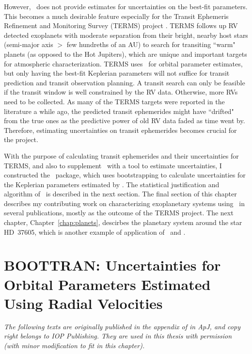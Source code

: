 However, \rvlin\ does not provide estimates for uncertainties on
the best-fit parameters. This becomes a much desirable feature
especially for the Transit Ephemeris Refinement and Monitoring Survey
(TERMS) project \citep{Kane2009}. TERMS follows up RV detected
exoplanets with moderate separation from their bright, nearby host
stars (semi-major axis $>$ few hundreths of an AU) to search for
transiting ``warm" planets (as opposed to the Hot Jupiters), which are
unique and important targets for atmospheric characterization. TERMS
uses \rvlin\ for orbital parameter estimates, but only having the
best-fit Keplerian parameters will not suffice for transit prediction
and transit observation planning. A transit search can only be
feasible if the transit window is well constrained by the RV
data. Otherwise, more RVs need to be collected. As many of the TERMS
targets were reported in the literature a while ago, the predicted
transit ephemerides might have ``drifted" from the true ones as the
predictive power of old RV data faded as time went by. Therefore,
estimating uncertainties on transit ephemerides becomes crucial for
the project.

With the purpose of calculating transit ephemerides and their
uncertainties for TERMS, and also to supplement \rvlin\ with a
tool to estimate uncertainties, I constructed the \boottran\ package,
which uses bootstrapping to calculate uncertainties for the Keplerian
parameters estimated by \rvlin. The statistical justification and
algorithm of \boottran\ is described in the next section. The final
section of this chapter describes my contributing work on
characterizing exoplanetary systems using \boottran\ in several
publications, mostly as the outcome of the TERMS project. The next
chapter, Chapter~\ref{chap:planets}, descirbes the planetary system
around the star HD~37605, which is another example of application of
\rvlin\ and \boottran.



\section{BOOTTRAN: Uncertainties for Orbital Parameters Estimated
  Using Radial Velocities}\label{boottran:sec:boottran}

{\it
  The following texts are originally published in the appendix of
  \cite{wang2012} in {\it ApJ}, and copy right belongs to IOP
  Publishing. They are used in this thesis with permission (with
  minor modification to fit in this chapter). 
}

